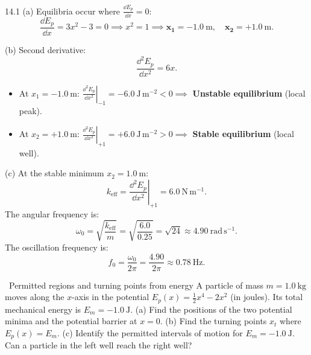 \begin{solution}{14.1}
(a) Equilibria occur where $\frac{\dd E_p}{\dd x} = 0$:
\[
\frac{\dd E_p}{\dd x} = 3x^2 - 3 = 0 \implies x^2 = 1 \implies \mathbf{x_1 = -1.0\ \mathrm{m},\quad x_2 = +1.0\ \mathrm{m}.}
\]

(b) Second derivative:
\[
\frac{\dd^2 E_p}{\dd x^2} = 6x.
\]
\begin{itemize}[leftmargin=1.4em,itemsep=2pt]
  \item At $x_1 = -1.0\ \mathrm{m}$: $\left.\frac{\dd^2 E_p}{\dd x^2}\right|_{-1} = -6.0\ \mathrm{J\,m^{-2}} < 0 \implies$ \textbf{Unstable equilibrium} (local peak).
  \item At $x_2 = +1.0\ \mathrm{m}$: $\left.\frac{\dd^2 E_p}{\dd x^2}\right|_{+1} = +6.0\ \mathrm{J\,m^{-2}} > 0 \implies$ \textbf{Stable equilibrium} (local well).
\end{itemize}

(c) At the stable minimum $x_2 = 1.0\ \mathrm{m}$:
\[
k_{\text{eff}} = \left.\frac{\dd^2 E_p}{\dd x^2}\right|_{+1} = \mathbf{6.0\ \mathrm{N\,m^{-1}}.}
\]
The angular frequency is:
\[
\omega_0 = \sqrt{\frac{k_{\text{eff}}}{m}} = \sqrt{\frac{6.0}{0.25}} = \sqrt{24} \approx 4.90\ \mathrm{rad\,s^{-1}}.
\]
The oscillation frequency is:
\[
f_0 = \frac{\omega_0}{2\pi} = \frac{4.90}{2\pi} \approx \mathbf{0.78\ \mathrm{Hz}.}
\]
\end{solution}

\begin{exercise}{\warm\ Permitted regions and turning points from energy}
A particle of mass $m=1.0\ \mathrm{kg}$ moves along the $x$-axis in the potential $E_p(x) = \frac{1}{2}x^4 - 2x^2$ (in joules).
Its total mechanical energy is $E_m = -1.0\ \mathrm{J}$.
(a) Find the positions of the two potential minima and the potential barrier at $x = 0$.
(b) Find the turning points $x_t$ where $E_p(x) = E_m$.
(c) Identify the permitted intervals of motion for $E_m = -1.0\ \mathrm{J}$. Can a particle in the left well reach the right well?
\end{exercise}

\begin{tabletworkspace}[5.5cm]
\end{tabletworkspace}

